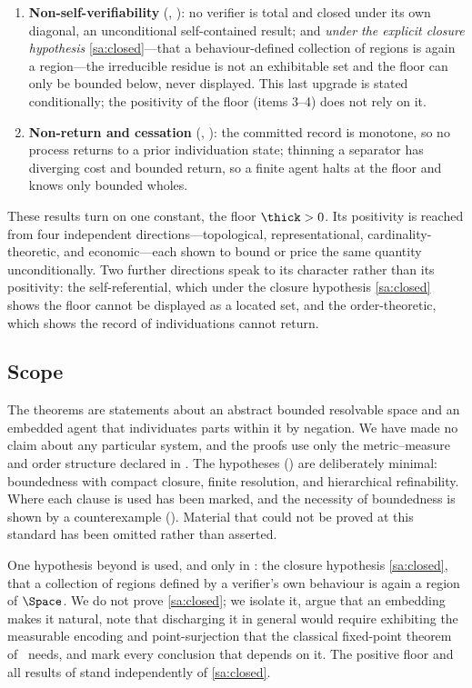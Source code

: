 \begin{enumerate}[label=(\arabic*),leftmargin=2.4em]
().
\item \textbf{Non-self-verifiability} (,
): no verifier is total and closed under its own
diagonal, an unconditional self-contained result; and \emph{under the explicit
closure hypothesis} \ref{sa:closed}---that a behaviour-defined collection of
regions is again a region---the irreducible residue is not an exhibitable set and
the floor can only be bounded below, never displayed. This last upgrade is stated
conditionally; the positivity of the floor (items 3--4) does not rely on it.
\item \textbf{Non-return and cessation} (,
): the committed record is monotone, so no process returns to
a prior individuation state; thinning a separator has diverging cost and bounded
return, so a finite agent halts at the floor and knows only bounded wholes.
\end{enumerate}

These results turn on one constant, the floor $\thick>0$. Its positivity is
reached from four independent directions---topological, representational,
cardinality-theoretic, and economic---each shown to bound or price the same
quantity unconditionally. Two further directions speak to its character rather
than its positivity: the self-referential, which under the closure hypothesis
\ref{sa:closed} shows the floor cannot be displayed as a located set, and the
order-theoretic, which shows the record of individuations cannot return.

\subsection{Scope}

The theorems are statements about an abstract bounded resolvable space and an
embedded agent that individuates parts within it by negation. We have made no
claim about any particular system, and the proofs use only the metric--measure
and order structure declared in . The hypotheses
() are deliberately minimal: boundedness with compact closure,
finite resolution, and hierarchical refinability. Where each clause is used has
been marked, and the necessity of boundedness is shown by a counterexample
(). Material that could not be proved at this standard
has been omitted rather than asserted.

One hypothesis beyond  is used, and only in : the
closure hypothesis \ref{sa:closed}, that a collection of regions defined by a
verifier's own behaviour is again a region of $\Space$. We do not prove
\ref{sa:closed}; we isolate it, argue that an embedding makes it natural, note
that discharging it in general would require exhibiting the measurable encoding
and point-surjection that the classical fixed-point theorem of~\citet{lawvere1969}
needs, and mark every conclusion that depends on it. The positive floor and all
results of 
stand independently of \ref{sa:closed}.

